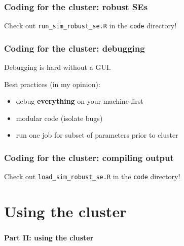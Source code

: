 \documentclass[12pt, 
hyperref={colorlinks=true, linkcolor=BlueViolet, urlcolor=BlueViolet},dvipsnames]{beamer}
\begin{document}
\begin{frame}
\frametitle{Coding for the cluster: robust SEs}

Check out \texttt{run\_sim\_robust\_se.R} in the \texttt{code} directory!

\end{frame}

\begin{frame}
\frametitle{Coding for the cluster: debugging}

Debugging is hard without a GUI. \pause

Best practices (in my opinion): \vspace{-0.3cm} \pause
\begin{itemize}
\item debug \textbf{everything} on your machine first \pause
\item modular code \pause (isolate bugs) \pause
\item run one job for subset of parameters prior to cluster
\end{itemize}

\end{frame}

\begin{frame}
\frametitle{Coding for the cluster: compiling output}

Check out \texttt{load\_sim\_robust\_se.R} in the \texttt{code} directory!

\end{frame}

\section{Using the cluster}
\begin{frame}
\frametitle{}
\begin{center}
{\large \textbf{Part II: using the cluster}}
\end{center}
\end{frame}
\end{document}
